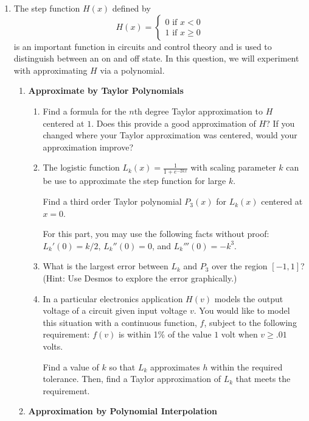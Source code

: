 \begin{enumerate}
	\item The step function $H(x)$  defined by
	      \[
		      H(x) = \begin{cases}
			      0  \text{ if } x < 0 \\
			      1 \text { if } x \geq 0
		      \end{cases}
	      \]
	      is an important function in circuits and control theory
	      and is used to distinguish between an on and off state.
		  In this question, we will experiment with approximating $H$ via a polynomial.
	      \begin{enumerate}
		      \item \textbf{Approximate by Taylor Polynomials}
		            \begin{enumerate}
						\item Find a formula for the $n$th degree Taylor approximation to $H$ centered 
						at $1$. Does this provide a good approximation of $H$? If you changed where your
						Taylor approximation was centered, would your approximation improve?
			            \item The logistic function $L_k(x) = \frac{1}{1+e^{-2kx}}$ with scaling parameter $k$ 
						can be use to approximate the step function for large $k$.
						
						Find a third order Taylor polynomial $P_3(x)$ for $L_k(x)$ centered at $x=0$. 
						
						For this part, you may use the following facts without proof: $L_k'(0)=k/2$, $L_k''(0) =0$, and $L_k'''(0) = -k^3$.
			            \item What is the largest error between 
						$L_k$ and $P_3$ over the region $[-1,1]$? (Hint: Use Desmos to explore the error graphically.)

						\item In a particular electronics application $H(v)$ models the output 
						voltage of a circuit given input voltage $v$. You would like to model 
						this situation with a continuous function, $f$, subject to the following requirement:
						$f(v)$ is within 1\% of the value $1$ volt when $v\geq .01$ volts.

						Find a value of $k$ so that $L_k$ approximates $h$ within the required tolerance.
						Then, find a Taylor approximation of $L_k$ that meets the requirement.
		            \end{enumerate}


		      \item \textbf{Approximation by Polynomial Interpolation}


\end{enumerate}
\end{enumerate}
